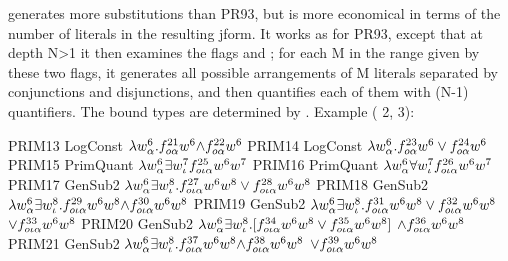  generates more substitutions than PR93, but is more economical
in terms of the number of literals in the resulting jform. It works as for PR93,
except that at depth N>1 it then examines the flags 
and ; for each M in the range given by these two flags,
it generates all possible arrangements of M literals separated by conjunctions and
disjunctions, and then quantifies each of them with (N-1) quantifiers. The bound
types are determined by . Example ( 2,
 3):
\begin{tpsexample}
     PRIM13   LogConst     \(\lambda w \sp{{6}}\sb{\alpha} .f \sp{{21}}\sb{o\alpha}  w \sp{{6}}  \mathord{\wedge} f \sp{{22}}\sb{o\alpha}  w \sp{{6}}\)
     PRIM14   LogConst     \(\lambda w \sp{{6}}\sb{\alpha} .f \sp{{23}}\sb{o\alpha}  w \sp{{6}}  \lor f \sp{{24}}\sb{o\alpha}  w \sp{{6}}\)
     PRIM15   PrimQuant   \(\lambda w \sp{{6}}\sb{\alpha}   \exists w \sp{{7}}\sb{\iota}  f \sp{{25}}\sb{o\iota\alpha}  w \sp{{6}}  w \sp{{7}}\)
     PRIM16   PrimQuant   \(\lambda w \sp{{6}}\sb{\alpha}   \forall w \sp{{7}}\sb{\iota}  f \sp{{26}}\sb{o\iota\alpha}  w \sp{{6}}  w \sp{{7}}\)
     PRIM17   GenSub2   \(\lambda w \sp{{6}}\sb{\alpha}   \exists w \sp{{8}}\sb{\iota} .f \sp{{27}}\sb{o\iota\alpha}  w \sp{{6}}  w \sp{{8}}  \lor f \sp{{28}}\sb{o\iota\alpha}  w \sp{{6}}  w \sp{{8}}\)
     PRIM18   GenSub2   \(\lambda w \sp{{6}}\sb{\alpha}   \exists w \sp{{8}}\sb{\iota} .f \sp{{29}}\sb{o\iota\alpha}  w \sp{{6}}  w \sp{{8}}  \mathord{\wedge} f \sp{{30}}\sb{o\iota\alpha}  w \sp{{6}}  w \sp{{8}}\)
     PRIM19   GenSub2   \(\lambda w \sp{{6}}\sb{\alpha}   \exists w \sp{{8}}\sb{\iota} .f \sp{{31}}\sb{o\iota\alpha}  w \sp{{6}}  w \sp{{8}}  \lor f \sp{{32}}\sb{o\iota\alpha}  w \sp{{6}}  w \sp{{8}}  \)
               \(\lor f \sp{{33}}\sb{o\iota\alpha}  w \sp{{6}}  w \sp{{8}}\)
     PRIM20   GenSub2   \(\lambda w \sp{{6}}\sb{\alpha}   \exists w \sp{{8}}\sb{\iota} .[f \sp{{34}}\sb{o\iota\alpha}  w \sp{{6}}  w \sp{{8}}  \lor f \sp{{35}}\sb{o\iota\alpha}  w \sp{{6}}  w \sp{{8}} ] \)
               \(\land f \sp{{36}}\sb{o\iota\alpha}  w \sp{{6}}  w \sp{{8}}\)
     PRIM21   GenSub2   \(\lambda w \sp{{6}}\sb{\alpha}   \exists w \sp{{8}}\sb{\iota} .f \sp{{37}}\sb{o\iota\alpha}  w \sp{{6}}  w \sp{{8}}  \mathord{\wedge} f \sp{{38}}\sb{o\iota\alpha}  w \sp{{6}}  w \sp{{8}}  \)
               \(\lor f \sp{{39}}\sb{o\iota\alpha}  w \sp{{6}}  w \sp{{8}}\)

\end{tpsexample}

